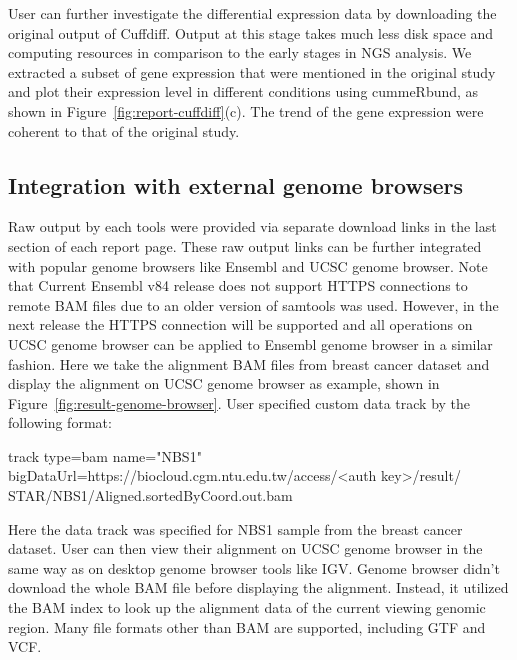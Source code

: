 User can further investigate the differential expression data by downloading
the original output of Cuffdiff. Output at this stage takes much less disk
space and computing resources in comparison to the early stages in NGS
analysis. We extracted a subset of gene expression that were mentioned in the
original study \cite{himes2014:rnaseq} and plot their expression level in
different conditions using cummeRbund, as shown in
Figure~\ref{fig:report-cuffdiff}(c). The trend of the gene expression were
coherent to that of the original study.



\subsection{Integration with external genome browsers}



Raw output by each tools were provided via separate download links in the last
section of each report page. These raw output links can be further integrated
with popular genome browsers like Ensembl and UCSC genome browser. Note that
Current Ensembl v84 release does not support HTTPS connections to remote BAM
files due to an older version of samtools was used. However, in the next
release the HTTPS connection will be supported and all operations on UCSC
genome browser can be applied to Ensembl genome browser in a similar fashion.
Here we take the alignment BAM files from breast cancer dataset and display the
alignment on UCSC genome browser as example, shown in
Figure~\ref{fig:result-genome-browser}. User specified custom data track by the
following format:

\begin{CVerbatim}[fontsize=\small]
track type=bam name="NBS1"
bigDataUrl=https://biocloud.cgm.ntu.edu.tw/access/<auth key>/result/
STAR/NBS1/Aligned.sortedByCoord.out.bam
\end{CVerbatim}

\vspace{-1em}\noindent
Here the data track was specified for NBS1 sample from the breast cancer
dataset. User can then view their alignment on UCSC genome browser in the same
way as on desktop genome browser tools like IGV. Genome browser didn't download
the whole BAM file before displaying the alignment. Instead, it utilized the
BAM index to look up the alignment data of the current viewing genomic region.
Many file formats other than BAM are supported, including GTF and VCF.



